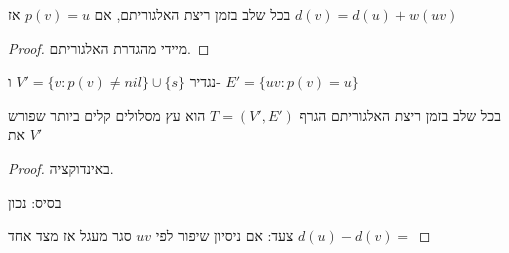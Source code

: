 \begin{claim}
בכל שלב בזמן ריצת האלגוריתם, אם
$p(v) = u$
אז 
$d(v) = d(u) + w(uv)$
\end{claim}
\begin{proof}
מיידי מהגדרת האלגוריתם.
\end{proof}



נגדיר
$V' = \{v : p(v) \neq nil\} \cup \{s\}$
ו-%
$E' = \{uv : p(v) = u\}$
\begin{claim}
בכל שלב בזמן ריצת האלגוריתם הגרף 
$T = (V', E')$
הוא עץ מסלולים קלים ביותר שפורש את 
$V'$
\end{claim}
\begin{proof}
באינדוקציה.

בסיס: נכון

צעד: אם ניסיון שיפור לפי $uv$ סגר מעגל אז מצד אחד 
$d(u) - d(v) = $

\end{proof}
